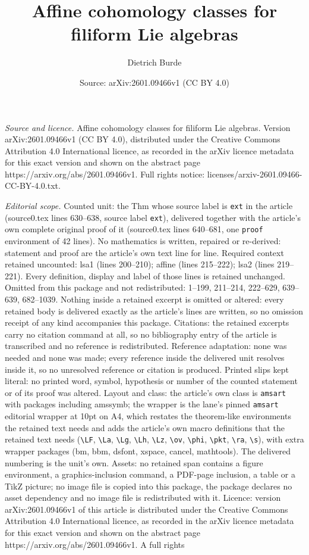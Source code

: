 \documentclass[10pt,a4paper]{amsart}
\title[Affine cohomology classes for filiform Lie algebras]{Affine cohomology classes for filiform Lie algebras}
\author{Dietrich Burde}
\date{Source: arXiv:2601.09466v1 (CC BY 4.0)}
\begin{document}
\maketitle

\noindent\emph{Source and licence.} Affine cohomology classes for filiform Lie algebras. Version arXiv:2601.09466v1 (CC BY 4.0), distributed under the Creative Commons Attribution 4.0 International licence, as recorded in the arXiv licence metadata for this exact version and shown on the abstract page https://arxiv.org/abs/2601.09466v1. Full rights notice: licenses/arxiv-2601.09466-CC-BY-4.0.txt.\par\smallskip

\noindent\textit{Editorial scope.} Counted unit: the Thm whose source label is \texttt{ext} in the article (source0.tex lines 630--638, source label \texttt{ext}), delivered together with the article's own complete original proof of it (source0.tex lines 640--681, one \texttt{proof} environment of 42 lines). No mathematics is written, repaired or re-derived: statement and proof are the article's own text line for line. Required context retained uncounted: lsa1 (lines 200--210); affine (lines 215--222); lsa2 (lines 219--221). Every definition, display and label of those lines is retained unchanged. Omitted from this package and not redistributed: 1--199, 211--214, 222--629, 639--639, 682--1039. Nothing inside a retained excerpt is omitted or altered: every retained body is delivered exactly as the article's lines are written, so no omission receipt of any kind accompanies this package. Citations: the retained excerpts carry no citation command at all, so no bibliography entry of the article is transcribed and no reference is redistributed. Reference adaptation: none was needed and none was made; every reference inside the delivered unit resolves inside it, so no unresolved reference or citation is produced. Printed slips kept literal: no printed word, symbol, hypothesis or number of the counted statement or of its proof was altered. Layout and class: the article's own class is \texttt{amsart} with packages including amssymb; the wrapper is the lane's pinned \texttt{amsart} editorial wrapper at 10pt on A4, which restates the theorem-like environments the retained text needs and adds the article's own macro definitions that the retained text needs (\texttt{\textbackslash LF}, \texttt{\textbackslash La}, \texttt{\textbackslash Lg}, \texttt{\textbackslash Lh}, \texttt{\textbackslash Lz}, \texttt{\textbackslash ov}, \texttt{\textbackslash phi}, \texttt{\textbackslash pkt}, \texttt{\textbackslash ra}, \texttt{\textbackslash s}), with extra wrapper packages (bm, bbm, dsfont, xspace, cancel, mathtools). The delivered numbering is the unit's own. Assets: no retained span contains a figure environment, a graphics-inclusion command, a PDF-page inclusion, a table or a TikZ picture; no image file is copied into this package, the package declares no asset dependency and no image file is redistributed with it. Licence: version arXiv:2601.09466v1 of this article is distributed under the Creative Commons Attribution 4.0 International licence, as recorded in the arXiv licence metadata for this exact version and shown on the abstract page https://arxiv.org/abs/2601.09466v1. A full rights 
\end{document}
